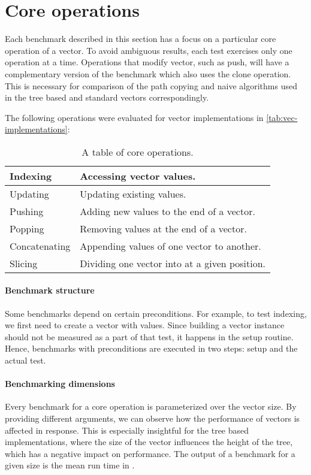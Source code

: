\section{Core operations}
Each benchmark described in this section has a focus on a particular core operation of a vector. To avoid ambiguous results, each test exercises only one operation at a time. Operations that modify vector, such as push, will have a complementary version of the benchmark which also uses the clone operation. This is necessary for comparison of the path copying and naive algorithms used in the tree based and standard vectors correspondingly. 

The following operations were evaluated for vector implementations in \ref{tab:vec-implementations}:

\begin{table}[!htbp]
    \centering

    \begin{tabular} { |l| p{10cm} | }
        \hline 
        Indexing & Accessing vector values. \\ \hline
        Updating & Updating existing values. \\ \hline
        Pushing & Adding new values to the end of a vector. \\ \hline
        Popping & Removing values at the end of a vector. \\ \hline
        Concatenating & Appending values of one vector to another. \\ \hline
        Slicing & Dividing one vector into at a given position. \\ \hline        
    \end{tabular}
    
    \label{tab:vec-core-operations}
    \caption{A table of core operations.}
\end{table}

\paragraph*{Benchmark structure}
Some benchmarks depend on certain preconditions. For example, to test indexing, we first need to create a vector with values. Since building a vector instance should not be measured as a part of that test, it happens in the setup routine. Hence, benchmarks with preconditions are executed in two steps: setup and the actual test. 

\paragraph*{Benchmarking dimensions}
Every benchmark for a core operation is parameterized over the vector size. By providing different arguments, we can observe how the performance of vectors is affected in response. This is especially insightful for the tree based implementations, where the size of the vector influences the height of the tree, which has a negative impact on performance. The output of a benchmark for a given size is the mean run time in . 

